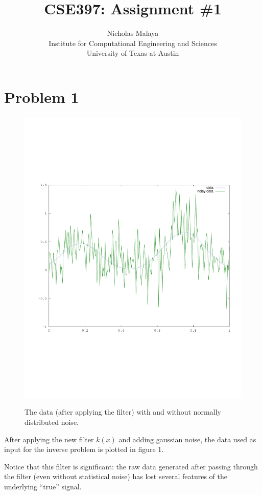 \documentclass{article}
\title{\bf{CSE397: Assignment \#1}}
\author{Nicholas Malaya \\ Institute for Computational Engineering and Sciences \\ University of Texas at Austin} \date{}
\begin{document}
\maketitle

\newpage
\section{Problem 1}

\begin{figure}[!htb]
  \includegraphics[scale=.5]{plots/data.pdf}
  \label{fig:data}
  \caption{The data (after applying the filter) with and without
 normally distributed noise. } 
\end{figure}

After applying the new filter $k(x)$ and adding gaussian noise, the data
used as input for the inverse problem is plotted in figure 1. 

Notice that this filter is significant: the raw data generated after
passing through the filter (even without statistical noise) has lost
several features of the underlying ``true'' signal. 
\end{document}
